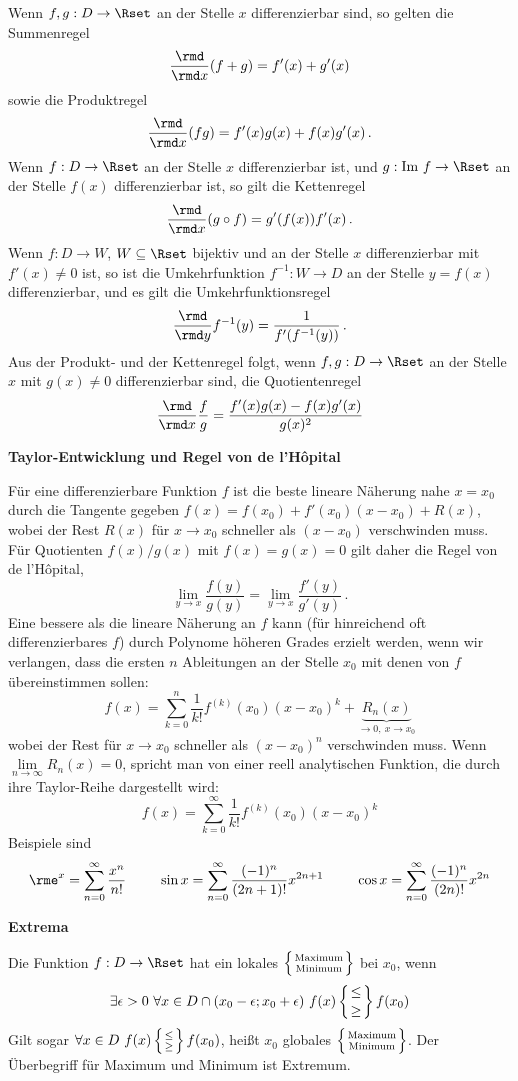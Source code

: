 \documentclass[a4paper,10pt]{article}
\begin{document}
Wenn $f,g:D\to\Rset$ an der Stelle $x$ differenzierbar sind, so gelten
die Summenregel
\[
\frac{\rmd}{\rmd x}(f+g)=f'(x)+g'(x)
\]
sowie die Produktregel
\[
\frac{\rmd}{\rmd x}(fg)=f'(x)g(x)+f(x)g'(x)\,.
\]
Wenn $f:D\to\Rset$ an der Stelle $x$ differenzierbar ist, und
$g:\textrm{Im}~f\to\Rset$ an der Stelle $f(x)$ differenzierbar ist,
so gilt die Kettenregel
\[
\frac{\rmd}{\rmd x}(g\circ f)=g'(f(x))f'(x)\,.
\]
Wenn $f:D\to W$, $W\subseteq\Rset$ bijektiv und an der Stelle $x$
differenzierbar mit $f'(x)\not=0$ ist, so ist die Umkehrfunktion
$f^{-1}:W\to D$ an der Stelle $y=f(x)$ differenzierbar, und es gilt
die Umkehrfunktionsregel
\[
\frac{\rmd}{\rmd y}f^{-1}(y) = \frac{1}{f'(f^{-1}(y))}\,.
\]
Aus der Produkt- und der Kettenregel folgt, wenn $f,g:D\to\Rset$
an der Stelle $x$ mit $g(x)\not=0$ differenzierbar sind, die Quotientenregel
\[
\frac{\rmd}{\rmd x}\frac{f}{g}=\frac{f'(x)g(x)-f(x)g'(x)}{g(x)^2}
\]
\pagebreak

{\bf Taylor-Entwicklung und Regel von de l'H\^opital}

Für eine differenzierbare Funktion $f$ ist die beste lineare Näherung
nahe $x=x_0$ durch die Tangente gegeben $f(x)= f(x_0)+f'(x_0)(x-x_0) +R(x)$,
wobei der Rest $R(x)$ für $x\to x_0$ schneller als $(x-x_0)$ verschwinden
muss.
Für Quotienten $f(x)/g(x)$ mit $f(x)=g(x)=0$ gilt daher die
Regel von de l'H\^opital,
\[
\lim\limits_{y\to x}\frac{f(y)}{g(y)} = \lim\limits_{y\to x}\frac{f'(y)}{g'(y)}\,.
\]
Eine bessere als die lineare Näherung an $f$ kann (für hinreichend oft
differenzierbares $f$) durch Polynome höheren Grades erzielt
werden, wenn wir verlangen, dass die ersten $n$ Ableitungen an der Stelle $x_0$
mit denen von $f$ übereinstimmen sollen:
\[
f(x) =\sum_{k=0}^n \frac{1}{k!}f^{(k)}(x_0)(x-x_0)^k + \underbrace{R_n(x)}_{\to 0,~x\to x_0}
\]
wobei der Rest für $x\to x_0$ schneller als $(x-x_0)^n$ verschwinden muss.
Wenn $\lim\limits_{n\to\infty}R_n(x)=0$, spricht man von einer reell
analytischen Funktion, die durch ihre Taylor-Reihe dargestellt wird:
\[
f(x)=\sum_{k=0}^\infty \frac{1}{k!}f^{(k)}(x_0)(x-x_0)^k
\]
Beispiele sind
\[
\rme^x = \sum\limits_{n=0}^\infty \frac{x^n}{n!}~~~~~~~\sin x = \sum\limits_{n=0}^\infty \frac{(-1)^n}{(2n+1)!}x^{2n+1}~~~~~~~\cos x = \sum\limits_{n=0}^\infty \frac{(-1)^n}{(2n)!}x^{2n}
\]

{\bf Extrema}

Die Funktion $f:D\to\Rset$ hat ein lokales
$\left\{{\textrm{Maximum} \atop \textrm{Minimum}}\right\}$ bei $x_0$, wenn
\[\exists \epsilon>0~\forall x\in D\cap(x_0-\epsilon;x_0+\epsilon)~
f(x)\left\{{\le \atop \ge}\right\}f(x_0)\] Gilt sogar
$\forall x\in D~f(x)\left\{{\le \atop \ge}\right\}f(x_0)$, heißt $x_0$
globales $\left\{{\textrm{Maximum} \atop \textrm{Minimum}}\right\}$.
Der Überbegriff für Maximum und Minimum ist Extremum.
\end{document}
